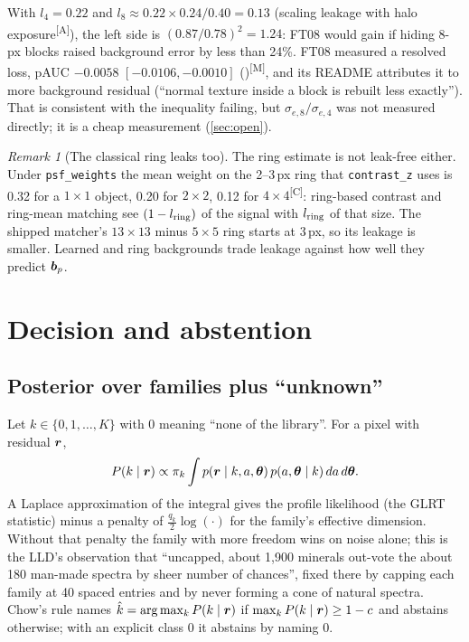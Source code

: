 \documentclass[11pt,a4paper]{article}
\theoremstyle{plain}
\theoremstyle{definition}
\theoremstyle{remark}
\newtheorem{remark}[proposition]{Remark}
\newcommand{\bvec}{\B{b}}
\newcommand{\rv}{\B{r}}
\newcommand{\meas}{\textsuperscript{\textsf{\scriptsize[M]}}}
\newcommand{\comp}{\textsuperscript{\textsf{\scriptsize[C]}}}
\newcommand{\assm}{\textsuperscript{\textsf{\scriptsize[A]}}}
\begin{document}
With $l_4=0.22$ and $l_8\approx0.22\times0.24/0.40=0.13$ (scaling leakage with halo exposure\assm), the left side is
$(0.87/0.78)^2=1.24$: FT08 would gain if hiding 8-px blocks raised background error by less than 24\%. FT08 measured a
resolved loss, pAUC $-0.0058$ $[-0.0106,-0.0010]$ ()\meas, and its README attributes it to more
background residual (``normal texture inside a block is rebuilt less exactly''). That is consistent with the inequality failing,
but $\sigma_{e,8}/\sigma_{e,4}$ was not measured directly; it is a cheap measurement (\cref{sec:open}).

\begin{remark}[The classical ring leaks too]
The ring estimate is not leak-free either. Under \verb|psf_weights| the mean weight on the 2--3\,px ring that
\verb|contrast_z| uses is 0.32 for a $1\times1$ object, 0.20 for $2\times2$, 0.12 for $4\times4$\comp: ring-based contrast and
ring-mean matching see $(1-l_{\rm ring})$ of the signal with $l_{\rm ring}$ of that size. The shipped matcher's $13\times13$
minus $5\times5$ ring starts at 3\,px, so its leakage is smaller. Learned and ring backgrounds trade leakage against how
well they predict $\bvec_p$.
\end{remark}

\section{Decision and abstention}
\label{sec:decision}

\subsection{Posterior over families plus ``unknown''}

Let $k\in\{0,1,\dots,K\}$ with $0$ meaning ``none of the library''. For a pixel with residual $\rv$,
\[
  P(k\mid\rv)\propto\pi_k\int p(\rv\mid k,a,\B\theta)\,p(a,\B\theta\mid k)\,da\,d\B\theta .
\]
A Laplace approximation of the integral gives the profile likelihood (the GLRT statistic) minus a penalty of
$\tfrac{q_k}{2}\log(\cdot)$ for the family's effective dimension. Without that penalty the family with more freedom wins on
noise alone; this is the LLD's observation that ``uncapped, about 1,900 minerals out-vote the about 180 man-made spectra
by sheer number of chances'', fixed there by capping each family at 40 spaced entries and by never forming a cone of natural
spectra. Chow's rule \cite{Chow1970} names $\hat k=\arg\max_k P(k\mid\rv)$ if $\max_k P(k\mid\rv)\ge1-c$ and abstains
otherwise; with an explicit class 0 it abstains by naming 0.
\end{document}
